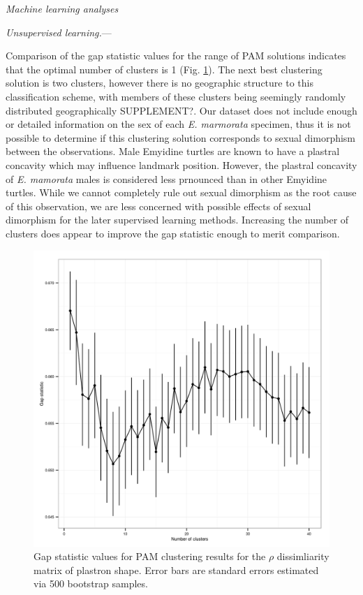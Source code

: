 \documentclass[12pt,letterpaper]{article}\usepackage{graphicx, color}
\renewcommand{\subsection}[1]{%
\bigskip
\begin{center}
\begin{large}
\normalfont\itshape #1
\end{large}
\end{center}}
\renewcommand{\subsubsection}[1]{%
\vspace{2ex}
\noindent
\textit{#1.}---}
\begin{document}
\subsection{Machine learning analyses}
\subsubsection{Unsupervised learning}

Comparison of the gap statistic values for the range of PAM solutions indicates that the optimal number of clusters is 1 (Fig. \ref{fig:gap}). The next best clustering solution is two clusters, however there is no geographic structure to this classification scheme, with members of these clusters being seemingly randomly distributed geographically SUPPLEMENT?. Our dataset does not include enough or detailed information on the sex of each \textit{E. marmorata} specimen, thus it is not possible to determine if this clustering solution corresponds to sexual dimorphism between the observations. Male Emyidine turtles are known to have a plastral concavity which may influence landmark position. However, the plastral concavity of \textit{E. mamorata} males is considered less prnounced than in other Emyidine turtles. While we cannot completely rule out sexual dimorphism as the root cause of this observation, we are less concerned with possible effects of sexual dimorphism for the later supervised learning methods.
Increasing the number of clusters does appear to improve the gap statistic enough to merit comparison. 

\begin{figure}[ht]
  \centering
  \includegraphics[width = \textwidth]{figure/gap_res}
  \caption{Gap statistic values for PAM clustering results for the \(\rho\) dissimliarity matrix of plastron shape. Error bars are standard errors estimated via 500 bootstrap samples.}
  \label{fig:gap}
\end{figure}
\end{document}
